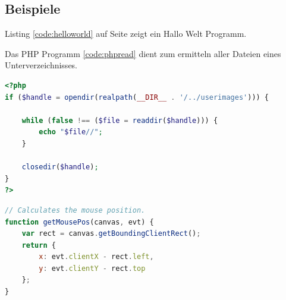 \subsection{Beispiele}

Listing \ref{code:helloworld} auf Seite \pageref{code:helloworld} zeigt ein Hallo Welt Programm.

\begin{minipage}{\linewidth}

\end{minipage}


Das PHP Programm \ref{code:phpread} dient zum ermitteln aller Dateien eines Unterverzeichnisses.

\begin{lstlisting}[language=PHP,caption={Alle Dateinamen ausgeben.},label=code:phpread]
<?php
if ($handle = opendir(realpath(__DIR__ . '/../userimages'))) {
    
    while (false !== ($file = readdir($handle))) {
        echo "$file//";
    }

    closedir($handle);
}
?>
\end{lstlisting}

\begin{lstlisting}[language=JavaScript,caption={Mausposition ermitteln.}]
// Calculates the mouse position.
function getMousePos(canvas, evt) {
	var rect = canvas.getBoundingClientRect();
	return {
		x: evt.clientX - rect.left,
		y: evt.clientY - rect.top
	};
}
\end{lstlisting}














